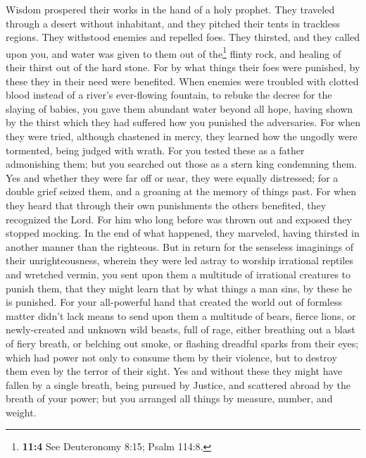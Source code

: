  Wisdom prospered their works in the hand of a holy
prophet.  They traveled through a desert without
inhabitant, and they pitched their tents in trackless regions.
 They withstood enemies and repelled foes. 
They thirsted, and they called upon you, and water was given to them out
of the\footnote{\textbf{11:4} See Deuteronomy 8:15; Psalm 114:8.} flinty
rock, and healing of their thirst out of the hard stone. 
For by what things their foes were punished, by these they in their need
were benefited.  When enemies were troubled with clotted
blood instead of a river's ever-flowing fountain,  to
rebuke the decree for the slaying of babies, you gave them abundant
water beyond all hope,  having shown by the thirst which
they had suffered how you punished the adversaries.  For
when they were tried, although chastened in mercy, they learned how the
ungodly were tormented, being judged with wrath.  For you
tested these as a father admonishing them; but you searched out those as
a stern king condemning them.  Yes and whether they were
far off or near, they were equally distressed;  for a
double grief seized them, and a groaning at the memory of things past.
 For when they heard that through their own punishments
the others benefited, they recognized the Lord.  For him
who long before was thrown out and exposed they stopped mocking. In the
end of what happened, they marveled, having thirsted in another manner
than the righteous.  But in return for the senseless
imaginings of their unrighteousness, wherein they were led astray to
worship irrational reptiles and wretched vermin, you sent upon them a
multitude of irrational creatures to punish them,  that
they might learn that by what things a man sins, by these he is
punished.  For your all-powerful hand that created the
world out of formless matter didn't lack means to send upon them a
multitude of bears, fierce lions,  or newly-created and
unknown wild beasts, full of rage, either breathing out a blast of fiery
breath, or belching out smoke, or flashing dreadful sparks from their
eyes;  which had power not only to consume them by their
violence, but to destroy them even by the terror of their sight.
 Yes and without these they might have fallen by a single
breath, being pursued by Justice, and scattered abroad by the breath of
your power; but you arranged all things by measure, number, and weight.
